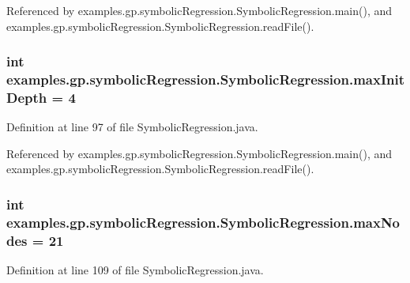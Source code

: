 Referenced by examples.\-gp.\-symbolic\-Regression.\-Symbolic\-Regression.\-main(), and examples.\-gp.\-symbolic\-Regression.\-Symbolic\-Regression.\-read\-File().

\hypertarget{classexamples_1_1gp_1_1symbolic_regression_1_1_symbolic_regression_a41ce468f8d781e1b1105aa420f736f61}{
\subsubsection[{max\-Init\-Depth}]{\setlength{\rightskip}{0pt plus 5cm}int examples.\-gp.\-symbolic\-Regression.\-Symbolic\-Regression.\-max\-Init\-Depth = 4\hspace{0.3cm}{\ttfamily [static]}}}\label{classexamples_1_1gp_1_1symbolic_regression_1_1_symbolic_regression_a41ce468f8d781e1b1105aa420f736f61}


Definition at line 97 of file Symbolic\-Regression.\-java.



Referenced by examples.\-gp.\-symbolic\-Regression.\-Symbolic\-Regression.\-main(), and examples.\-gp.\-symbolic\-Regression.\-Symbolic\-Regression.\-read\-File().

\hypertarget{classexamples_1_1gp_1_1symbolic_regression_1_1_symbolic_regression_adc03c7a1f5cc422df01229c112571017}{
\subsubsection[{max\-Nodes}]{\setlength{\rightskip}{0pt plus 5cm}int examples.\-gp.\-symbolic\-Regression.\-Symbolic\-Regression.\-max\-Nodes = 21\hspace{0.3cm}{\ttfamily [static]}}}\label{classexamples_1_1gp_1_1symbolic_regression_1_1_symbolic_regression_adc03c7a1f5cc422df01229c112571017}


Definition at line 109 of file Symbolic\-Regression.\-java.



